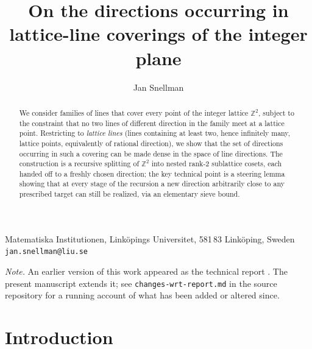 \documentclass[a4paper,11pt,oneside,reqno]{amsart}
\theoremstyle{definition}
\theoremstyle{remark}
\theoremstyle{plain}
\newcommand{\Z}{\mathbb{Z}}
\begin{document}
\title[Lattice-line directions]{On the directions occurring in lattice-line coverings of the integer plane}
\author{Jan Snellman }
\address{Matematiska Institutionen, Linköpings Universitet, 581 83 Linköping, Sweden}
\makeatletter
\let\addresses\@empty
\makeatother
\maketitle

\begin{center}
  \small
  Matematiska Institutionen, Linköpings Universitet, 581\,83 Linköping, Sweden\\
  \texttt{jan.snellman@liu.se}
\end{center}

\begin{abstract}
  We consider families of lines that cover every point of the integer lattice \(\Z^2\), subject to
  the constraint that no two lines of different direction in the family meet at a lattice point.
  Restricting to \emph{lattice lines} (lines containing at least two, hence infinitely many,
  lattice points, equivalently of rational direction), we show that the set of directions
  occurring in such a covering can be made dense in the space of line directions. The construction
  is a recursive splitting of \(\Z^2\) into nested rank-2 sublattice cosets, each handed off to a
  freshly chosen direction; the key technical point is a steering lemma showing that at every
  stage of the recursion a new direction arbitrarily close to any prescribed target can still be
  realized, via an elementary sieve bound.
\end{abstract}

\begin{center}
\footnotesize
\emph{Note.} An earlier version of this work appeared as the technical report
\cite{report2026}. The present manuscript extends it; see \texttt{changes-wrt-report.md} in the
source repository \cite{gitrepo} for a running account of what has been added or altered since.
\end{center}

\section{Introduction}
\end{document}
